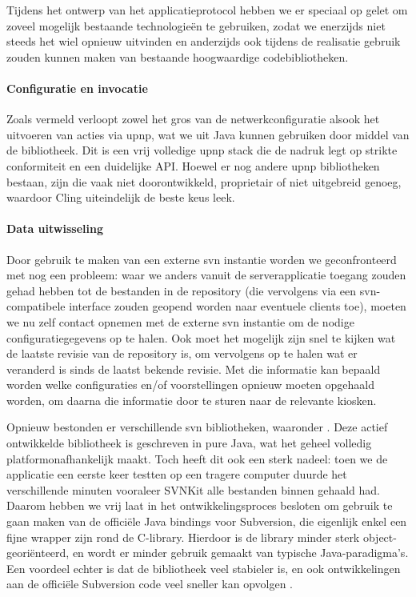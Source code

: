Tijdens het ontwerp van het applicatieprotocol hebben we er speciaal op gelet om zoveel mogelijk bestaande technologieën te gebruiken, zodat we enerzijds niet steeds het wiel opnieuw uitvinden en anderzijds ook tijdens de realisatie gebruik zouden kunnen maken van bestaande hoogwaardige codebibliotheken.

\paragraph{Configuratie en invocatie} Zoals vermeld verloopt zowel het gros van de netwerkconfiguratie alsook het uitvoeren van acties via \ac{upnp}, wat we uit Java kunnen gebruiken door middel van de  bibliotheek. Dit is een vrij volledige \ac{upnp} stack die de nadruk legt op strikte conformiteit en een duidelijke API. Hoewel er nog andere \ac{upnp} bibliotheken bestaan, zijn die vaak niet doorontwikkeld, proprietair of niet uitgebreid genoeg, waardoor Cling uiteindelijk de beste keus leek.

\paragraph{Data uitwisseling} Door gebruik te maken van een externe \ac{svn} instantie worden we geconfronteerd met nog een probleem: waar we anders vanuit de serverapplicatie toegang zouden gehad hebben tot de bestanden in de repository (die vervolgens via een \ac{svn}-compatibele interface zouden geopend worden naar eventuele clients toe), moeten we nu zelf contact opnemen met de externe \ac{svn} instantie om de nodige configuratiegegevens op te halen. Ook moet het mogelijk zijn snel te kijken wat de laatste revisie van de repository is, om vervolgens op te halen wat er veranderd is sinds de laatst bekende revisie. Met die informatie kan bepaald worden welke configuraties en/of voorstellingen opnieuw moeten opgehaald worden, om daarna die informatie door te sturen naar de relevante kiosken.

Opnieuw bestonden er verschillende \ac{svn} bibliotheken, waaronder . Deze actief ontwikkelde bibliotheek is geschreven in pure Java, wat het geheel volledig platformonafhankelijk maakt. Toch heeft dit ook een sterk nadeel: toen we de applicatie een eerste keer testten op een tragere computer duurde het verschillende minuten vooraleer SVNKit alle bestanden binnen gehaald had. Daarom hebben we vrij laat in het ontwikkelingsproces besloten om gebruik te gaan maken van de officiële Java bindings voor Subversion, die eigenlijk enkel een fijne wrapper zijn rond de C-library. Hierdoor is de library minder sterk object-georiënteerd, en wordt er minder gebruik gemaakt van typische Java-paradigma's. Een voordeel echter is dat de bibliotheek veel stabieler is, en ook ontwikkelingen aan de officiële Subversion code veel sneller kan opvolgen \citep{svn:javahl}.

